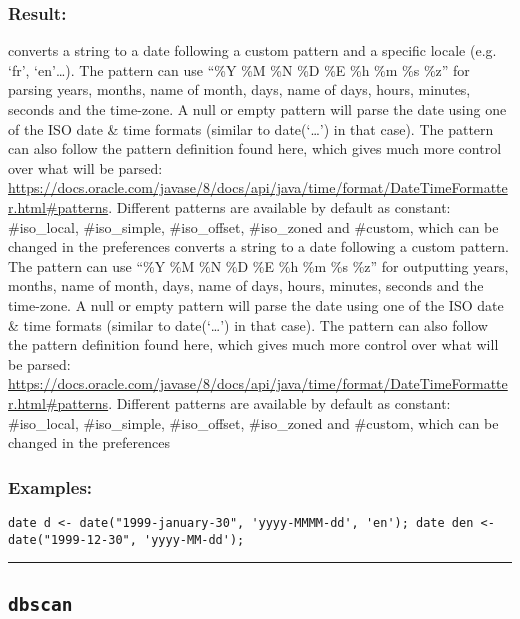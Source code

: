 \documentclass[]{book}
\theoremstyle{definition}
\theoremstyle{definition}
\theoremstyle{definition}
\theoremstyle{remark}
\begin{document}
\subsubsection{Result:}\label{result-120}

converts a string to a date following a custom pattern and a specific
locale (e.g. `fr', `en'\ldots{}). The pattern can use ``\%Y \%M \%N \%D
\%E \%h \%m \%s \%z'' for parsing years, months, name of month, days,
name of days, hours, minutes, seconds and the time-zone. A null or empty
pattern will parse the date using one of the ISO date \& time formats
(similar to date(`\ldots{}') in that case). The pattern can also follow
the pattern definition found here, which gives much more control over
what will be parsed:
\url{https://docs.oracle.com/javase/8/docs/api/java/time/format/DateTimeFormatter.html\#patterns}.
Different patterns are available by default as constant: \#iso\_local,
\#iso\_simple, \#iso\_offset, \#iso\_zoned and \#custom, which can be
changed in the preferences converts a string to a date following a
custom pattern. The pattern can use ``\%Y \%M \%N \%D \%E \%h \%m \%s
\%z'' for outputting years, months, name of month, days, name of days,
hours, minutes, seconds and the time-zone. A null or empty pattern will
parse the date using one of the ISO date \& time formats (similar to
date(`\ldots{}') in that case). The pattern can also follow the pattern
definition found here, which gives much more control over what will be
parsed:
\url{https://docs.oracle.com/javase/8/docs/api/java/time/format/DateTimeFormatter.html\#patterns}.
Different patterns are available by default as constant: \#iso\_local,
\#iso\_simple, \#iso\_offset, \#iso\_zoned and \#custom, which can be
changed in the preferences

\subsubsection{Examples:}\label{examples-94}

\begin{verbatim}
date d <- date("1999-january-30", 'yyyy-MMMM-dd', 'en'); date den <- date("1999-12-30", 'yyyy-MM-dd'); 
\end{verbatim}

\begin{center}\rule{0.5\linewidth}{\linethickness}\end{center}

\subsection{\texorpdfstring{\texttt{dbscan}}{dbscan}}\label{dbscan}
\end{document}
